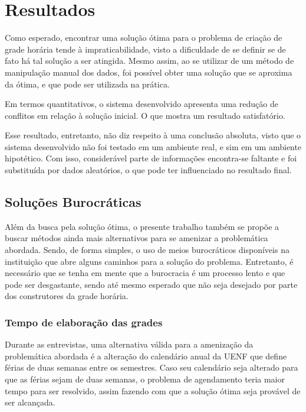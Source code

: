 \chapter{Resultados} %

Como esperado, encontrar uma solução ótima para o problema de criação de grade horária tende à impraticabilidade, visto a dificuldade de se definir se de fato há tal solução a ser atingida. Mesmo assim, ao se utilizar de um método de manipulação manual dos dados, foi possível obter uma solução que se aproxima da ótima, e que pode ser utilizada na prática.

Em termos quantitativos, o sistema desenvolvido apresenta uma redução de conflitos em relação à solução inicial. O que mostra um resultado satisfatório.


Esse resultado, entretanto, não diz respeito à uma conclusão absoluta, visto que o sistema desenvolvido não foi testado em um ambiente real, e sim em um ambiente hipotético. Com isso, considerável parte de informações encontra-se faltante e foi substituída por dados aleatórios, o que pode ter influenciado no resultado final.

\section{Soluções Burocráticas} %

    Além da busca pela solução ótima, o presente trabalho também se propõe a buscar métodos ainda mais alternativos para se amenizar a problemática abordada. Sendo, de forma simples, o uso de meios burocráticos disponíveis na instituição que abre alguns caminhos para a solução do problema. Entretanto, é necessário que se tenha em mente que a burocracia é um processo lento e que pode ser desgastante, sendo até mesmo esperado que não seja desejado por parte dos construtores da grade horária.

    \subsection{Tempo de elaboração das grades} %

        Durante as entrevistas, uma alternativa válida para a amenização da problemática abordada é a alteração do calendário anual da UENF que define férias de duas semanas entre os semestres. Caso seu calendário seja alterado para que as férias sejam de duas semanas, o problema de agendamento teria maior tempo para ser resolvido, assim fazendo com que a solução ótima seja provável de ser alcançada.

